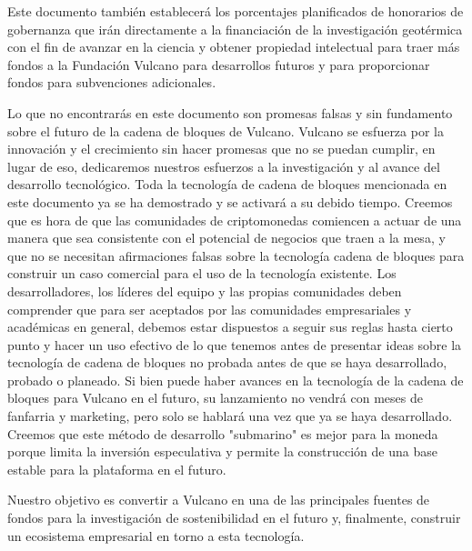 \documentclass[A4paper, 12pt]{article}
\begin{document}
Este documento también establecerá los porcentajes planificados de honorarios de gobernanza que irán directamente a la financiación de la investigación geotérmica con el fin de avanzar en la ciencia y obtener propiedad intelectual para traer más fondos a la Fundación Vulcano para desarrollos futuros y para proporcionar fondos para subvenciones adicionales.

Lo que no encontrarás en este documento son promesas falsas y sin fundamento sobre el futuro de la cadena de bloques de Vulcano.  Vulcano se esfuerza por la innovación y el crecimiento sin hacer promesas que no se puedan cumplir, en lugar de eso, dedicaremos nuestros esfuerzos a la investigación y al avance del desarrollo tecnológico. Toda la tecnología de cadena de bloques mencionada en este documento ya se ha demostrado y se activará a su debido tiempo.  Creemos que es hora de que las comunidades de criptomonedas comiencen a actuar de una manera que sea consistente con el potencial de negocios que traen a la mesa, y que no se necesitan afirmaciones falsas sobre la tecnología cadena de bloques para construir un caso comercial para el uso de la tecnología existente.  Los desarrolladores, los líderes del equipo y las propias comunidades deben comprender que para ser aceptados por las comunidades empresariales y académicas en general, debemos estar dispuestos a seguir sus reglas hasta cierto punto y hacer un uso efectivo de lo que tenemos antes de presentar ideas sobre la tecnología de cadena de bloques no probada antes de que se haya desarrollado, probado o planeado.  Si bien puede haber avances en la tecnología de la cadena de bloques para Vulcano en el futuro, su lanzamiento no vendrá con meses de fanfarria y marketing, pero solo se hablará una vez que ya se haya desarrollado.  Creemos que este método de desarrollo "submarino" es mejor para la moneda porque limita la inversión especulativa y permite la construcción de una base estable para la plataforma en el futuro.

Nuestro objetivo es convertir a Vulcano en una de las principales fuentes de fondos para la investigación de sostenibilidad en el futuro y, finalmente, construir un ecosistema empresarial en torno a esta tecnología.
\end{document}
